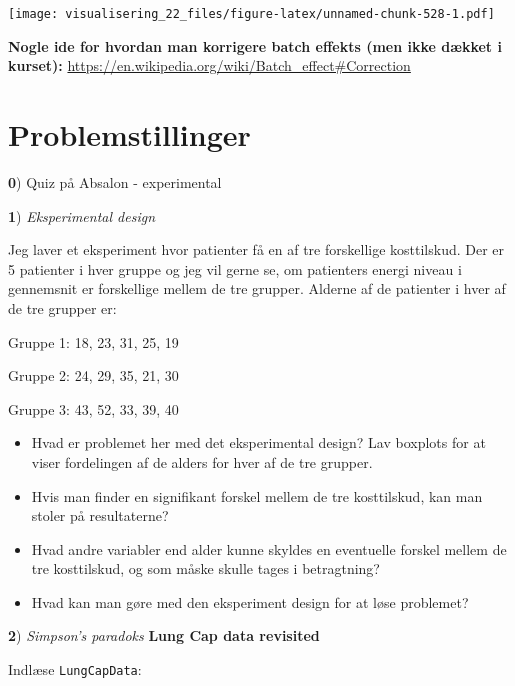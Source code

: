 \documentclass[
]{book}
\providecommand{\tightlist}{%
  \setlength{\itemsep}{0pt}\setlength{\parskip}{0pt}}
\begin{document}
\texttt{[image: visualisering\_22\_files/figure-latex/unnamed-chunk-528-1.pdf]}

\textbf{Nogle ide for hvordan man korrigere batch effekts (men ikke dækket i kurset):} \url{https://en.wikipedia.org/wiki/Batch_effect\#Correction}

\hypertarget{problemstillinger-9}{%
\section{Problemstillinger}\label{problemstillinger-9}}

\textbf{0}) Quiz på Absalon - experimental

\textbf{1}) \emph{Eksperimental design}

Jeg laver et eksperiment hvor patienter få en af tre forskellige kosttilskud. Der er 5 patienter i hver gruppe og jeg vil gerne se, om patienters energi niveau i gennemsnit er forskellige mellem de tre grupper. Alderne af de patienter i hver af de tre grupper er:

Gruppe 1: 18, 23, 31, 25, 19

Gruppe 2: 24, 29, 35, 21, 30

Gruppe 3: 43, 52, 33, 39, 40

\begin{itemize}
\tightlist
\item
  Hvad er problemet her med det eksperimental design? Lav boxplots for at viser fordelingen af de alders for hver af de tre grupper.
\item
  Hvis man finder en signifikant forskel mellem de tre kosttilskud, kan man stoler på resultaterne?
\item
  Hvad andre variabler end alder kunne skyldes en eventuelle forskel mellem de tre kosttilskud, og som måske skulle tages i betragtning?
\item
  Hvad kan man gøre med den eksperiment design for at løse problemet?
\end{itemize}

\textbf{2}) \emph{Simpson's paradoks} \textbf{Lung Cap data revisited}

Indlæse \texttt{LungCapData}:
\end{document}
